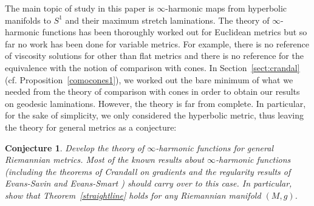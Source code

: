 \documentclass{ip-journal}
\newtheorem{conjecture}[theorem]{Conjecture}
\theoremstyle{definition}
\numberwithin{equation}{section}
\newcommand{\R}{\mathbb R}
\begin{document}
The main topic of study in this paper is $\infty$-harmonic maps from hyperbolic manifolds to $S^1$ and their maximum stretch laminations. The theory of $\infty$-harmonic functions has been thoroughly worked out for Euclidean metrics but so far no work has been done for variable metrics. For example, there is no reference of viscosity solutions for other than flat metrics and there is no reference for the equivalence with the notion of comparison with cones. In Section~\ref{sect:crandal} (cf. Proposition~\ref{comocones1}), we worked out the bare minimum of what we needed from the theory of comparison with cones in order to obtain our results on  geodesic laminations. However, the theory  is far from complete. In particular, for the sake of simplicity, we only considered the hyperbolic metric, thus leaving the theory for general metrics as a conjecture: 

\begin{conjecture} Develop the theory of $\infty$-harmonic functions for  general  Riemannian metrics. Most of the known results about $\infty$-harmonic functions (including the theorems of Crandall on gradients \cite{crandal} and the regularity results of  Evans-Savin \cite{evans-savin} and Evans-Smart \cite{evans-smart}) should carry over to this case.
 In particular, show that
 Theorem~\ref{straightline} holds for any Riemannian manifold $(M,g)$.
\end{conjecture}







\end{document}
